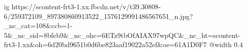  
 
 
 
 

\ifcmt
  ig https://scontent-frt3-1.xx.fbcdn.net/v/t39.30808-6/259372109_897380860913522_1576129991486567651_n.jpg?_nc_cat=108&ccb=1-5&_nc_sid=8bfeb9&_nc_ohc=6ETz9tbOfAIAX97wpQC&_nc_ht=scontent-frt3-1.xx&oh=6d20bd9651b0d6be823aaf19022a52ef&oe=61A1D0F7
  @width 0.4
\fi
